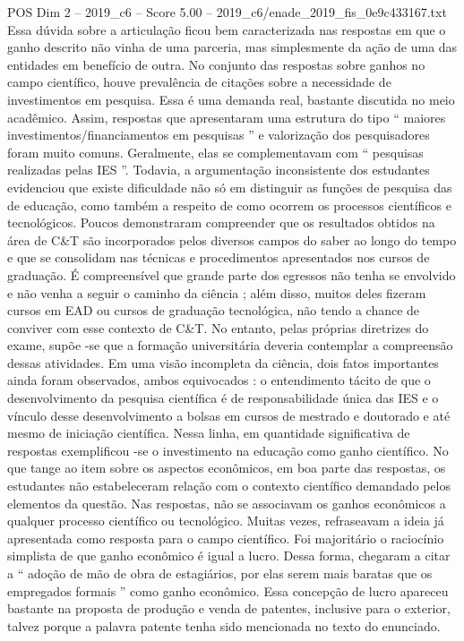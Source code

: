 \begin{textsample}{POS Dim 2 – 2019\_c6 – Score 5.00 – 2019\_c6/enade\_2019\_fis\_0e9c433167.txt}
Essa dúvida sobre a articulação ficou bem caracterizada nas respostas em que o ganho descrito não vinha de uma parceria, mas simplesmente da ação de uma das entidades em benefício de outra.
No conjunto das respostas sobre ganhos no campo científico, houve prevalência de citações sobre a necessidade de investimentos em pesquisa.
Essa é uma demanda real, bastante discutida no meio acadêmico.
Assim, respostas que apresentaram uma estrutura do tipo “ maiores investimentos/financiamentos em pesquisas ” e valorização dos pesquisadores foram muito comuns.
Geralmente, elas se complementavam com “ pesquisas realizadas pelas IES ”.
Todavia, a argumentação inconsistente dos estudantes evidenciou que existe dificuldade não só em distinguir as funções de pesquisa das de educação, como também a respeito de como ocorrem os processos científicos e tecnológicos.
Poucos demonstraram compreender que os resultados obtidos na área de C\&T são incorporados pelos diversos campos do saber ao longo do tempo e que se consolidam nas técnicas e procedimentos apresentados nos cursos de graduação.
É compreensível que grande parte dos egressos não tenha se envolvido e não venha a seguir o caminho da ciência ; além disso, muitos deles fizeram cursos em EAD ou cursos de graduação tecnológica, não tendo a chance de conviver com esse contexto de C\&T.
No entanto, pelas próprias diretrizes do exame, supõe -se que a formação universitária deveria contemplar a compreensão dessas atividades.
Em uma visão incompleta da ciência, dois fatos importantes ainda foram observados, ambos equivocados : o entendimento tácito de que o desenvolvimento da pesquisa científica é de responsabilidade única das IES e o vínculo desse desenvolvimento a bolsas em cursos de mestrado e doutorado e até mesmo de iniciação científica.
Nessa linha, em quantidade significativa de respostas exemplificou -se o investimento na educação como ganho científico.
No que tange ao item sobre os aspectos econômicos, em boa parte das respostas, os estudantes não estabeleceram relação com o contexto científico demandado pelos elementos da questão.
Nas respostas, não se associavam os ganhos econômicos a qualquer processo científico ou tecnológico.
Muitas vezes, refraseavam a ideia já apresentada como resposta para o campo científico.
Foi majoritário o raciocínio simplista de que ganho econômico é igual a lucro.
Dessa forma, chegaram a citar a “ adoção de mão de obra de estagiários, por elas serem mais baratas que os empregados formais ” como ganho econômico.
Essa concepção de lucro apareceu bastante na proposta de produção e venda de patentes, inclusive para o exterior, talvez porque a palavra patente tenha sido mencionada no texto do enunciado.

\end{textsample}
